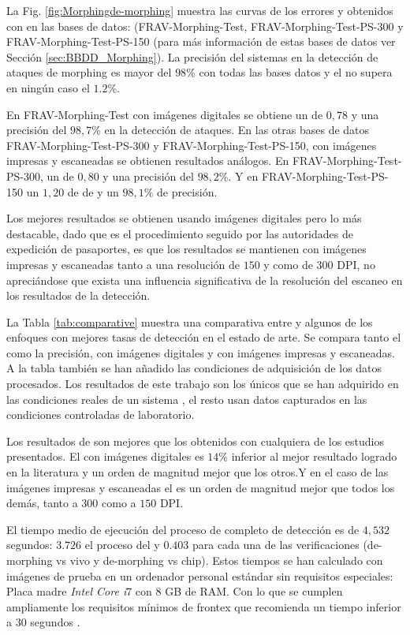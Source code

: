 La Fig. \ref{fig:Morphingde-morphing} muestra las curvas  de los errores  y  obtenidos con  en las bases de datos: (\Gls{FRAV-Morphing-Test}, \Gls{FRAV-Morphing-Test-PS-300} y \Gls{FRAV-Morphing-Test-PS-150} (para  más información de estas bases de datos ver Sección \ref{sec:BBDD_Morphing}). La precisión del sistemas en la detección de ataques de \gls{morphing} es mayor del $98$\% con todas las bases datos y el  no supera en ningún caso el $1.2$\%. 
 
En \Gls{FRAV-Morphing-Test} con imágenes digitales se obtiene un  de $0,78$ y una precisión del $98,7$\% en la detección de ataques. En las otras bases de datos \Gls{FRAV-Morphing-Test-PS-300} y \Gls{FRAV-Morphing-Test-PS-150}, con imágenes impresas y escaneadas se obtienen resultados análogos. En \Gls{FRAV-Morphing-Test-PS-300}, un  de $0,80$ y una precisión del $98,2$\%. Y en \Gls{FRAV-Morphing-Test-PS-150} un $1,20$ de  de y un $98,1$\% de precisión.

Los mejores resultados se obtienen usando imágenes digitales pero lo más destacable, dado que es el procedimiento seguido por las autoridades de expedición de pasaportes, es que los resultados se mantienen con imágenes impresas y escaneadas tanto a una resolución de $150$ y como de $300$ \gls{DPI}, no apreciándose que exista una influencia significativa de la resolución del escaneo en los resultados de la detección. 

La Tabla \ref{tab:comparative} muestra una comparativa entre  y algunos de los enfoques  con mejores tasas de detección en el estado de arte. Se compara tanto el  como la precisión, con imágenes digitales y con imágenes impresas y escaneadas. A la tabla también se han añadido las condiciones de adquisición de los datos procesados. Los resultados de este trabajo son los únicos que se han adquirido en las condiciones reales de un sistema , el resto usan datos capturados en las condiciones controladas de laboratorio. 

Los resultados de  son mejores que los obtenidos con cualquiera de los estudios presentados. El  con imágenes digitales es $14$\% inferior al mejor resultado logrado en la literatura y un orden de magnitud mejor que los otros.Y en el caso de las imágenes impresas y escaneadas el  es un orden de magnitud mejor que todos los demás, tanto a $300$ como a $150$ \gls{DPI}.

El tiempo medio de ejecución del proceso de completo de detección es de $4,532$ segundos: $3.726$ el proceso del  y $0.403$ para cada una de las verificaciones (\gls{de-morphing} vs \gls{vivo} y \gls{de-morphing} vs \gls{chip}). Estos tiempos se han calculado con imágenes de prueba en un ordenador personal estándar sin requisitos especiales: Placa madre \textit{Intel \textregistered Core \texttrademark i$7$} con $8$ GB de RAM. Con lo que se cumplen ampliamente los requisitos mínimos de \Gls{frontex} que recomienda un tiempo inferior a $30$ segundos \cite{FRONTEX2016TechReport}.

